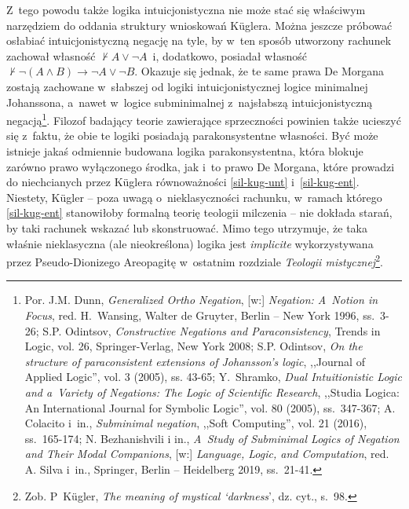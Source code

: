 Z~tego powodu także logika intuicjonistyczna nie może stać się właściwym narzędziem do oddania struktury wnioskowań Küglera. Można jeszcze próbować osłabiać intuicjonistyczną negację na tyle, by w~ten sposób utworzony rachunek zachował własność $\nvdash A \lor \neg A$~i, dodatkowo, posiadał własność $\nvdash \neg (A \land B) \to \neg A \lor \neg B$. Okazuje się jednak, że te same prawa De Morgana zostają zachowane w~słabszej od logiki intuicjonistycznej logice minimalnej Johanssona, a~nawet w~logice subminimalnej z~najsłabszą intuicjonistyczną negacją\footnote{Por. J.M. Dunn, \textit{Generalized Ortho Negation}, [w:] \textit{Negation: A~Notion in Focus}, red. H.~Wansing, Walter de Gruyter, Berlin -- New York 1996, ss.~3-26; S.P. Odintsov, \textit{Constructive Negations and Paraconsistency}, Trends in Logic, vol. 26, Springer-Verlag, New York 2008; S.P. Odintsov, \textit{On the structure of paraconsistent extensions of Johansson's logic}, ,,Journal of Applied Logic'', vol. 3 (2005), ss. 43-65; Y.~Shramko, \textit{Dual Intuitionistic Logic and a~Variety of Negations: The Logic of Scientific Research}, ,,Studia Logica: An International Journal for Symbolic Logic'', vol. 80 (2005), ss.~347-367; A. Colacito i~in., \textit{Subminimal negation}, ,,Soft Computing'', vol. 21 (2016), ss.~165-174; N. Bezhanishvili i in., \textit{A~Study of Subminimal Logics of Negation and Their Modal Companions}, [w:] \textit{Language, Logic, and Computation}, red. A. Silva i~in., Springer, Berlin -- Heidelberg 2019, ss.~21-41.}. Filozof badający teorie zawierające sprzeczności powinien także ucieszyć się z~faktu, że obie te logiki posiadają parakonsystentne własności. Być może istnieje jakaś odmiennie budowana logika parakonsystentna, która blokuje zarówno prawo wyłączonego środka, jak i~to prawo De Morgana, które prowadzi do niechcianych przez Küglera równoważności \ref{sil-kug-unt} i~\ref{sil-kug-ent}. Niestety, Kügler -- poza uwagą o~nieklasyczności rachunku, w~ramach którego \ref{sil-kug-ent} stanowiłoby formalną teorię teologii milczenia -- nie dokłada starań, by taki rachunek wskazać lub skonstruować. Mimo tego utrzymuje, że taka właśnie nieklasyczna (ale nieokreślona) logika jest \textit{implicite} wykorzystywana przez Pseudo-Dionizego Areopagitę w~ostatnim rozdziale \textit{Teologii mistycznej}\footnote{Zob. P~Kügler, \textit{The meaning of mystical ‘darkness}', dz. cyt., s.~98.}.


